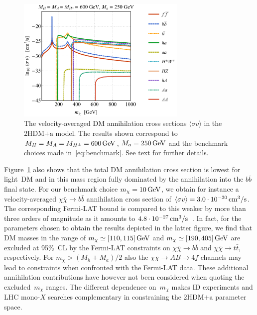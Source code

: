\documentclass[a4paper, 11pt,notoc]{article}
\newcommand{\hdma}{\ensuremath{\textrm{2HDM+a}}\xspace}
\begin{document}
\begin{figure}[t!]
\centering
\includegraphics[width=0.725\textwidth]{IDbenchmark.pdf}
\vspace{4mm}
\caption{The velocity-averaged DM annihilation cross sections $\langle \sigma v \rangle$ in the \hdma model. The  results shown correspond to $M_H = M_A = M_{H^\pm} = 600 \, {\rm GeV}$, $M_a = 250 \, {\rm GeV}$ and the benchmark choices made in~\eqref{eq:benchmark}. See text for further details. }
\label{fig:IDbenchmark}
\end{figure}

Figure~\ref{fig:IDbenchmark} also shows that the total DM annihilation cross section is lowest for light~DM and in this mass region fully dominated by the annihilation into the $b \bar b$ final state. For our benchmark choice $m_\chi = 10 \, {\rm GeV}$, we obtain  for instance a velocity-averaged $\chi \bar \chi \to b \bar b$ annihilation cross section   of  $\langle \sigma v \rangle = 3.0 \cdot 10^{-30} \, {\rm cm}^3/{\rm s}$. The corresponding Fermi-LAT bound is compared to this weaker by more than three orders of magnitude as it amounts to $4.8 \cdot 10^{-27} \, {\rm cm}^3/{\rm s}$~\cite{Fermi-LAT:2016uux}.  In fact, for the parameters chosen to obtain the results depicted in the latter figure, we find that DM masses in the range of $m_\chi \simeq [110, 115] \, {\rm GeV}$ and $m_\chi \simeq [190, 405] \, {\rm GeV}$ are excluded at 95\%~CL by the Fermi-LAT constraints on $\chi \bar \chi \to b \bar b$ and $\chi \bar \chi \to t \bar t$, respectively. For $m_\chi > (M_h + M_a)/2$ also the $\chi \bar \chi \to A B \to 4f$ channels may lead to constraints when confronted with the Fermi-LAT data. These additional annihilation contributions have however not been considered when quoting the excluded~$m_\chi$ ranges. The different dependence on~$m_\chi$ makes ID experiments and LHC mono-$X$ searches    complementary in constraining the \hdma parameter space. 
\end{document}
